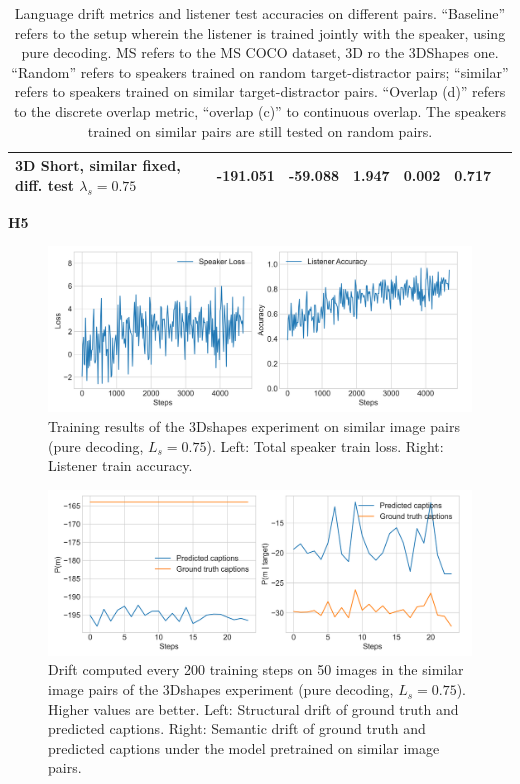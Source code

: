 \begin{table}[]
\begin{tabularx}{\textwidth}{|X|l|l|X|X|X|X|}
		3D Short, similar fixed, diff. test $\lambda_s = 0.75$&     -191.051        &        -59.088           &   1.947        &        0.002          &        0.717                               &                                           \\ \hline
	\end{tabularx}
	\caption{\label{tab:3dshapes_drift_metrics_basic_similar} Language drift metrics and listener test accuracies on different pairs. 
		``Baseline'' refers to the setup wherein the listener is trained jointly with the speaker, using pure decoding. MS refers to the MS COCO dataset, 3D ro the 3DShapes one. ``Random'' refers to speakers trained on random target-distractor pairs; ``similar'' refers to speakers trained on similar target-distractor pairs. ``Overlap (d)'' refers to the discrete overlap metric, ``overlap (c)'' to continuous overlap. The speakers trained on similar pairs are still tested on random pairs.}
\end{table}

\textbf{H5}

\begin{figure}[h]
	\centering
	\includegraphics[width=\linewidth]{images/3dshapes_refgame_49_pure_075_similar.png}
	\caption{Training results of the 3Dshapes experiment on similar image pairs (pure decoding, $L_s = 0.75$). Left: Total speaker train loss. Right: Listener train accuracy.}
	\label{fig:3dshapes_similar_075_speaker_loss_listener_acc}
\end{figure}

\begin{figure}[h]
	\centering
	\includegraphics[width=\linewidth]{images/3dshapes_structural_semantic_drift_4000_pure_075_similar.png}
	\caption{Drift computed every 200 training steps on 50 images in the similar image pairs of the 3Dshapes experiment (pure decoding, $L_s = 0.75$). Higher values are better. Left: Structural drift of ground truth and predicted captions. Right: Semantic drift of ground truth and predicted captions under the model pretrained on similar image pairs.} 
	\label{fig:3dshapes_similar_075_str_sem_drift}
\end{figure}

